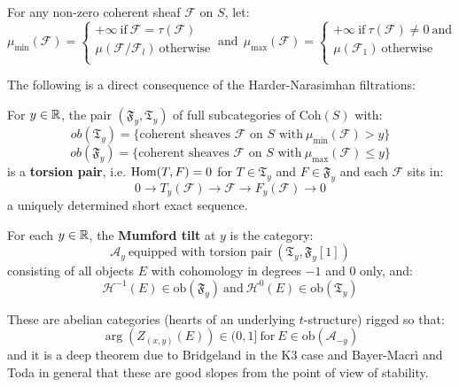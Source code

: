 \documentclass{amsart}
\begin{document}
\medskip




 For any non-zero coherent sheaf ${\mathcal F}$ on $S$, let:
\[ \mu_{\min}({\mathcal F}) = \left\{ \begin{array}{l} +\infty \ \mbox{if} \ {\mathcal F} = \tau({\mathcal F}) \\ 
\mu({\mathcal F}/{\mathcal F}_l) \ \mbox{otherwise} \\ 
\end{array} \right. \ \mbox{and} \ \ 
\mu_{\max}({\mathcal F}) = \left\{ \begin{array}{l} +\infty \ \mbox{if} \ \tau({\mathcal F}) \ne 0 \ \mbox{and}  \\  
\mu({\mathcal F}_1)  \ \mbox{otherwise} \\ 
\end{array} \right. \] 
 
 
The following is a direct consequence of the Harder-Narasimhan filtrations: 

\medskip


 For $y \in {\mathbb R}$, the pair $({\mathfrak F}_y, {\mathfrak T}_y)$ of full subcategories of Coh$(S)$ with: 
\[ ob({\mathfrak T}_y) =  \{ \mbox{coherent sheaves ${\mathcal F}$ on $S$ with}  \ \mu_{\min}({\mathcal F}) > y \} \] 
\[ ob({\mathfrak F}_y) =  \{ \mbox{coherent sheaves ${\mathcal F}$ on $S$ with}  \ \mu_{\max}({\mathcal F}) \le y \} \] 
is a {\bf torsion pair}, i.e. $\mbox{Hom}(T,F) = 0$ for $T \in {\mathfrak T}_y$ and $F \in {\mathfrak F}_y$ and each ${\mathcal F}$ sits in: 
\[ 0 \rightarrow T_y({\mathcal F}) \rightarrow {\mathcal F} \rightarrow F_y({\mathcal F}) \rightarrow 0 \] 
a uniquely determined short exact sequence. 

\medskip

 For each $y \in {\mathbb R}$, the {\bf Mumford tilt} at $y$ is the category: 
\[ {\mathcal A}_y \ \mbox{equipped with torsion pair}  \ ({\mathfrak T}_y, {\mathfrak F}_y[1]) \]
consisting of all objects $E$  with cohomology in degrees $-1$ and $0$ only, and: 
\[ {\mathcal H}^{-1}(E) \in \mbox{ob}({\mathfrak F}_y) \ \mbox{and} \ {\mathcal H}^0(E) \in \mbox{ob}({\mathfrak T}_y) \] 

These are abelian categories  (hearts of an underlying $t$-structure) rigged so that:
\[ \arg(Z_{(x,y)}(E)) \in (0,1] \ \mbox{for} \  E \in \mbox{ob}({\mathcal A}_{-y}) \] 
and it is a deep theorem 
due to Bridgeland in the K3 case and Bayer-Macr\`i and Toda in general that these 
are good slopes from the point of view of stability. 
\end{document}
